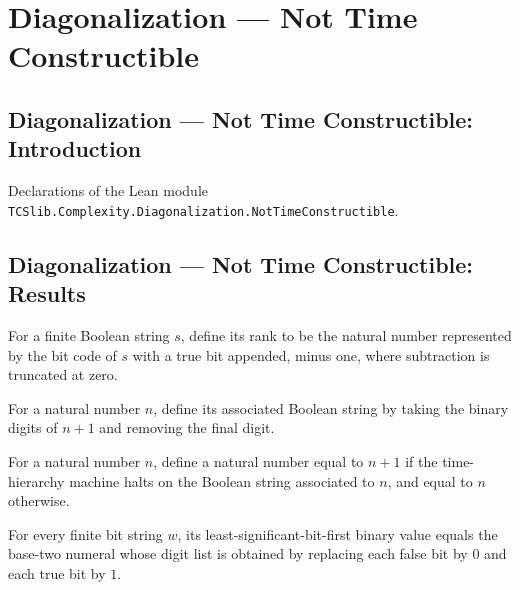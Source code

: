 \section{Diagonalization --- Not Time Constructible}
\subsection*{Diagonalization --- Not Time Constructible: Introduction}

Declarations of the Lean module \texttt{TCSlib.Complexity.Diagonalization.NotTimeConstructible}.

\subsection*{Diagonalization --- Not Time Constructible: Results}

\begin{definition}
\label{Complexity.ntcRank}
\leanok
{}
For a finite Boolean string $s$, define its rank to be the natural number represented by
the bit code of $s$ with a true bit appended, minus one, where subtraction is truncated
at zero.
\end{definition}

\begin{definition}
\label{Complexity.ntcStr}
\leanok
For a natural number $n$, define its associated Boolean string by taking the binary
digits of $n+1$ and removing the final digit.
\end{definition}

\begin{definition}
\label{Complexity.ntcT}
\leanok
{}
For a natural number $n$, define a natural number equal to $n+1$ if the time-hierarchy
machine halts on the Boolean string associated to $n$, and equal to $n$ otherwise.
\end{definition}

\begin{theorem}
\label{Complexity.ntc_codeBitsNat_eq_ofDigits}
\leanok
{}
For every finite bit string $w$, its least-significant-bit-first binary value equals the
base-two numeral whose digit list is obtained by replacing each false bit by $0$ and
each true bit by $1$.
\end{theorem}

